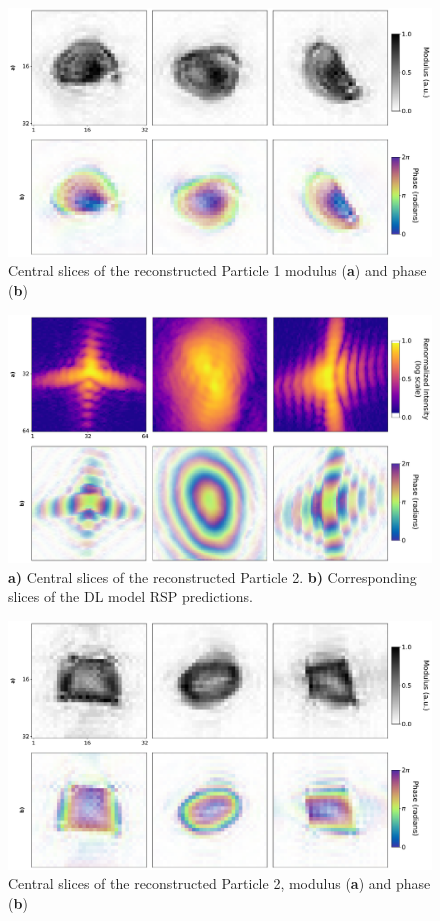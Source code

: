\begin{figure}[H]
    \centering
    \includegraphics[width=\textwidth]{figures/Phasing/exp_data_rec1.pdf}
    \caption{Central slices of the reconstructed Particle 1 modulus (\textbf{a}) and phase  (\textbf{b})}
    \label{fig:exp_obj1}
\end{figure}

\begin{figure}[H]
    \centering
    \includegraphics[width=\textwidth]{figures/Phasing/exp_data2.pdf}
    \caption{\textbf{a)} Central slices of the reconstructed Particle 2. \textbf{b)} Corresponding 
    slices of the DL model RSP predictions.}
    \label{fig:exp_RSP2}
\end{figure}

\begin{figure}[H]
    \centering
    \includegraphics[width=\textwidth]{figures/Phasing/exp_data_rec2.pdf}
    \caption{Central slices of the reconstructed Particle 2, modulus (\textbf{a}) and phase  (\textbf{b})}
    \label{fig:exp_obj2}
\end{figure}

